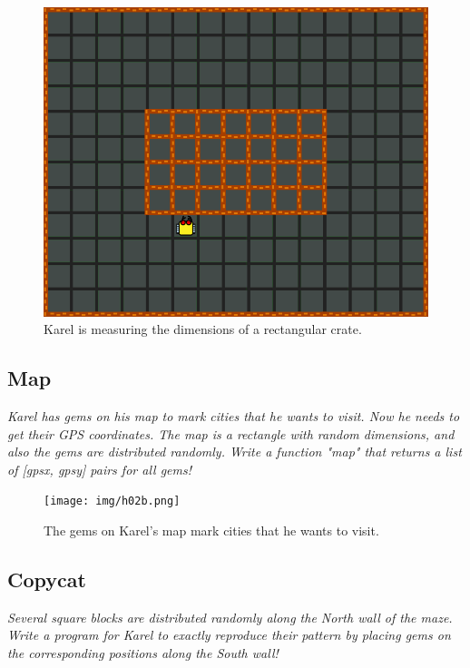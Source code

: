 \begin{figure}[!ht]
\begin{center}
\includegraphics[height=0.4\textwidth]{img/h02.png}
\end{center}
\vspace{-4mm}
\caption{Karel is measuring the dimensions of a rectangular crate.}
\label{fig:h02}
\vspace{-1.2cm}
\end{figure}


\subsection{Map}

{\em Karel has gems on his map to mark cities that he wants to visit. Now he needs to get their GPS coordinates. The map is a rectangle with random dimensions, and also the gems are distributed randomly. Write a function "map"  that returns a list of [gpsx, gpsy] pairs for all gems!}\\[-9mm]


\begin{figure}[!ht]
\begin{center}
\texttt{[image: img/h02b.png]}
\end{center}
\vspace{-4mm}
\caption{The gems on Karel's map mark cities that he wants to visit.}
\label{fig:h02b}
\vspace{-1.2cm}
\end{figure}
\newpage


\subsection{Copycat}

{\em Several square blocks are distributed randomly along the North wall of the maze. Write a program for Karel to exactly reproduce their pattern by placing gems on the corresponding positions along the South wall!}\\[-9mm]


